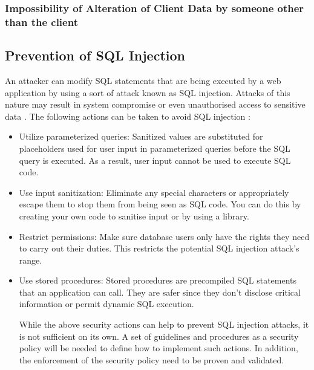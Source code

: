 \documentclass[journal]{IEEEtran}
\begin{document}
\subsubsection{Impossibility of Alteration of Client Data by someone other than the client}

\subsection{Prevention of SQL Injection}

An attacker can modify SQL statements that are being executed
by a web application by using a sort of attack known as SQL injection.
Attacks of this nature may result in system compromise or even
unauthorised access to sensitive data \cite{Crespo2023}\cite{Shishir2023}.
The following actions can be taken to avoid SQL injection \cite{owaspsql}:

\begin{itemize}
  \item {Utilize parameterized queries: Sanitized values are
        substituted for placeholders used for user input in parameterized
        queries before the SQL query is executed. As a result, user input
        cannot be used to execute SQL code.}


  \item {Use input sanitization: Eliminate any special characters
        or appropriately escape them to stop them from being seen as SQL
        code. You can do this by creating your own code to sanitise input
        or by using a library.}

  \item {Restrict permissions: Make sure database users only have
        the rights they need to carry out their duties. This restricts
        the potential SQL injection attack's range.}

  \item {Use stored procedures: Stored procedures are precompiled
        SQL statements that an application can call. They are safer since
        they don't disclose critical information or permit dynamic SQL execution.}

        While the above security actions can help to prevent SQL injection
        attacks, it is not sufficient on its own. A set of guidelines and procedures
        as a security policy will be needed to define how to implement such actions.
        In addition, the enforcement of the security policy need to be proven and validated.

\end{itemize}
\end{document}
